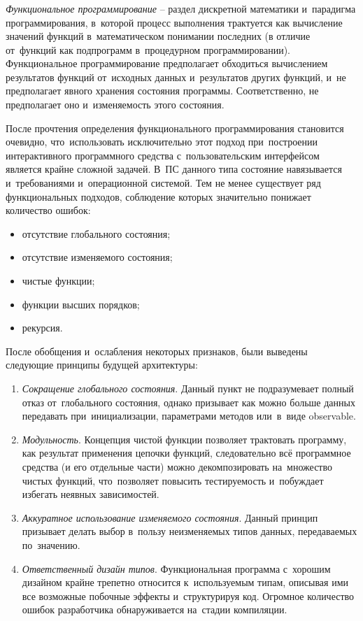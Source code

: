 \subsubsection{}
\label{sec:analysis:research:mobArch:fp}

\emph{Функциональное программирование} -- раздел дискретной математики и~парадигма программирования, в~которой процесс выполнения трактуется как вычисление значений функций в~математическом понимании последних (в отличие от~функций как подпрограмм в~процедурном программировании). Функциональное программирование предполагает обходиться вычислением результатов функций от~исходных данных и~результатов других функций, и~не предполагает явного хранения состояния программы. Соответственно, не предполагает оно и~изменяемость этого состояния\cite{wiki:fp}.

После прочтения определения функционального программирования становится очевидно, что~использовать исключительно этот подход при~построении интерактивного программного средства с~пользовательским интерфейсом является крайне сложной задачей. В~ПС данного типа состояние навязывается и~требованиями и~операционной системой. Тем не менее существует ряд функциональных подходов, соблюдение которых значительно понижает количество ошибок:

\begin{itemize}
\item отсутствие глобального состояния;
\item отсутствие изменяемого состояния;
\item чистые функции;
\item функции высших порядков;
\item рекурсия.
\end{itemize}

После обобщения и~ослабления некоторых признаков, были выведены следующие принципы будущей архитектуры:

\begin{enumerate}
\item \emph{Сокращение глобального состояния}. Данный пункт не подразумевает полный отказ от~глобального состояния, однако призывает как можно больше данных передавать при~инициализации, параметрами методов или~в~виде \gls{observable}.
\item \emph{Модульность}. Концепция чистой функции позволяет трактовать программу, как результат применения цепочки функций, следовательно всё программное средства (и его отдельные части) можно декомпозировать на~множество чистых функций, что~позволяет повысить тестируемость и~побуждает избегать неявных зависимостей.
\item \emph {Аккуратное использование изменяемого состояния}. Данный принцип призывает делать выбор в~пользу неизменяемых типов данных, передаваемых по~значению. 
\item \emph {Ответственный дизайн типов}. Функциональная программа с~хорошим дизайном крайне трепетно относится к~используемым типам, описывая ими все возможные побочные эффекты и~структурируя код. Огромное количество ошибок разработчика обнаруживается на~стадии компиляции.
\end{enumerate}

